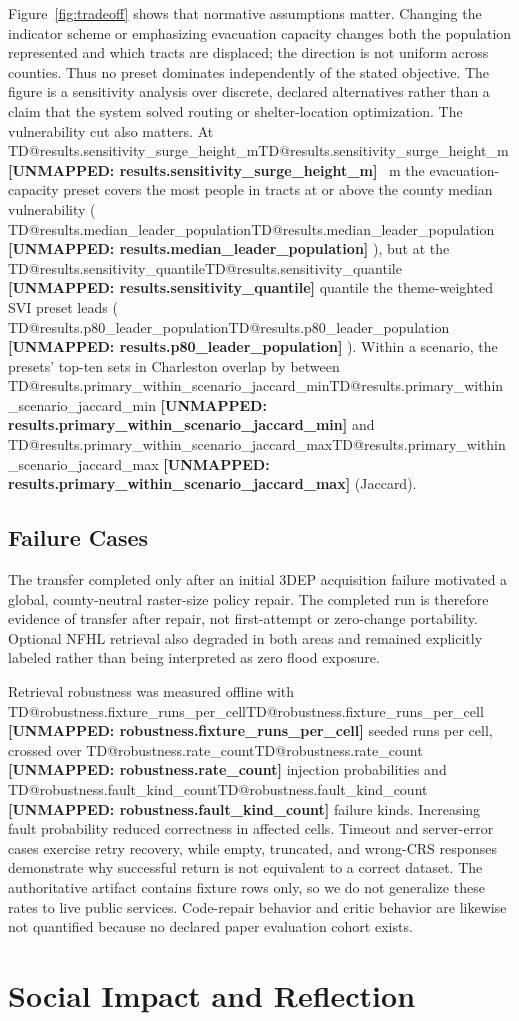 \documentclass[sigconf,nonacm]{acmart}
\makeatletter
\newcommand{\TD}[1]{%
  \ifcsname TD@#1\endcsname\csname TD@#1\endcsname%
  \else\textbf{[UNMAPPED: #1]}\fi%
}
\makeatother
\begin{document}
Figure~\ref{fig:tradeoff} shows that normative assumptions matter. Changing the
indicator scheme or emphasizing evacuation capacity changes both the population
represented and which tracts are displaced; the direction is not uniform across
counties. Thus no preset dominates independently of the stated objective. The
figure is a sensitivity analysis over discrete, declared alternatives rather
than a claim that the system solved routing or shelter-location optimization.
The vulnerability cut also matters. At \TD{results.sensitivity_surge_height_m}~m the evacuation-capacity preset
covers the most people in tracts at or above the county median vulnerability
(\TD{results.median_leader_population}), but at the
\TD{results.sensitivity_quantile} quantile the theme-weighted SVI preset leads
(\TD{results.p80_leader_population}). Within a scenario, the presets' top-ten
sets in Charleston overlap by between
\TD{results.primary_within_scenario_jaccard_min} and
\TD{results.primary_within_scenario_jaccard_max} (Jaccard).

\subsection{Failure Cases}

The transfer completed only after an initial 3DEP acquisition failure motivated
a global, county-neutral raster-size policy repair. The completed run is
therefore evidence of transfer after repair, not first-attempt or zero-change
portability. Optional NFHL retrieval also degraded in both areas and remained
explicitly labeled rather than being interpreted as zero flood exposure.

Retrieval robustness was measured offline with
\TD{robustness.fixture_runs_per_cell} seeded runs per cell, crossed over
\TD{robustness.rate_count} injection probabilities and
\TD{robustness.fault_kind_count} failure kinds. Increasing fault probability
reduced correctness in affected cells. Timeout and server-error cases exercise
retry recovery, while empty, truncated, and wrong-CRS responses demonstrate why
successful return is not equivalent to a correct dataset. The authoritative
artifact contains fixture rows only, so we do not generalize these rates to live
public services. Code-repair behavior and critic behavior are likewise not
quantified because no declared paper evaluation cohort exists.

\section{Social Impact and Reflection}
\end{document}
